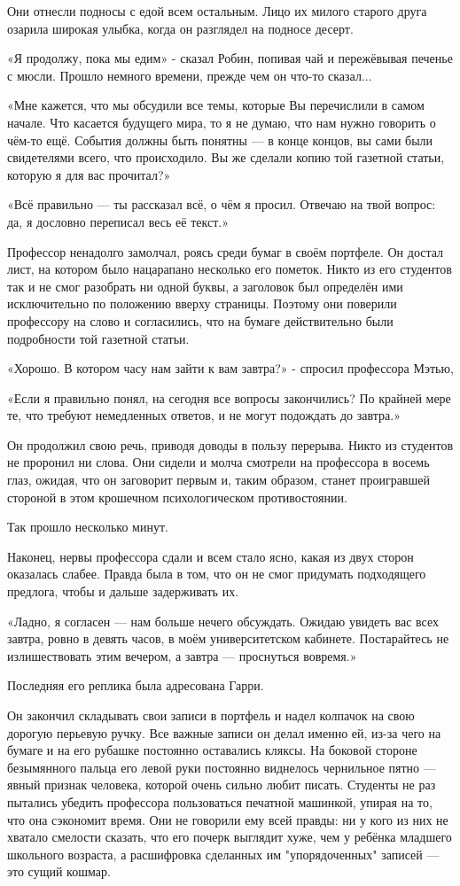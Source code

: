 \documentclass[a5paper, 9pt,
final, openany, twoside=true]{memoir}
\begin{document}
Они отнесли подносы с едой всем остальным. Лицо их милого старого друга озарила широкая улыбка, когда он разглядел на подносе десерт.

«Я продолжу, пока мы едим» - сказал Робин, попивая чай и пережёвывая печенье с мюсли. Прошло немного времени, прежде чем он что-то сказал...

«Мне кажется, что мы обсудили все темы, которые Вы перечислили в самом начале. Что касается будущего мира, то я не думаю, что нам нужно говорить о чём-то ещё. События должны быть понятны — в конце концов, вы сами были свидетелями всего, что происходило. Вы же сделали копию той газетной статьи, которую я для вас прочитал?»

«Всё правильно — ты рассказал всё, о чём я просил. Отвечаю на твой вопрос: да, я дословно переписал весь её текст.»

Профессор ненадолго замолчал, роясь среди бумаг в своём портфеле. Он достал лист, на котором было нацарапано несколько его пометок. Никто из его студентов так и не смог разобрать ни одной буквы, а заголовок был определён ими исключительно по положению вверху страницы. Поэтому они поверили профессору на слово и согласились, что на бумаге действительно были подробности той газетной статьи.

«Хорошо. В котором часу нам зайти к вам завтра?» - спросил профессора Мэтью,

«Если я правильно понял, на сегодня все вопросы закончились? По крайней мере те, что требуют немедленных ответов, и не могут подождать до завтра.»

Он продолжил свою речь, приводя доводы в пользу перерыва. Никто из студентов не проронил ни слова. Они сидели и молча смотрели на профессора в восемь глаз, ожидая, что он заговорит первым и, таким образом, станет проигравшей стороной в этом крошечном психологическом противостоянии.

Так прошло несколько минут.

Наконец, нервы профессора сдали и всем стало ясно, какая из двух сторон оказалась слабее. Правда была в том, что он не смог придумать подходящего предлога, чтобы и дальше задерживать их.

«Ладно, я согласен — нам больше нечего обсуждать. Ожидаю увидеть вас всех завтра, ровно в девять часов, в моём университетском кабинете. Постарайтесь не излишествовать этим вечером, а завтра — проснуться вовремя.»

Последняя его реплика была адресована Гарри.

Он закончил складывать свои записи в портфель и надел колпачок на свою дорогую перьевую ручку. Все важные записи он делал именно ей, из-за чего на бумаге и на его рубашке постоянно оставались кляксы. На боковой стороне безымянного пальца его левой руки постоянно виднелось чернильное пятно — явный признак человека, которой очень сильно любит писать. Студенты не раз пытались убедить профессора пользоваться печатной машинкой, упирая на то, что она сэкономит время. Они не говорили ему всей правды: ни у кого из них не хватало смелости сказать, что его почерк выглядит хуже, чем у ребёнка младшего школьного возраста, а расшифровка сделанных им "упорядоченных" записей — это сущий кошмар.
\end{document}
